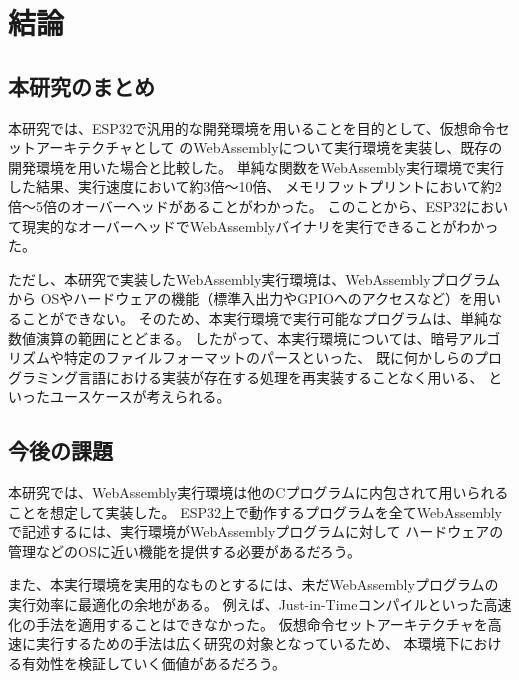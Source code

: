 \chapter{結論}
\label{chap:conclusion}

\section{本研究のまとめ}
\label{section:matome}

本研究では、ESP32で汎用的な開発環境を用いることを目的として、仮想命令セットアーキテクチャとして
のWebAssemblyについて実行環境を実装し、既存の開発環境を用いた場合と比較した。
単純な関数をWebAssembly実行環境で実行した結果、実行速度において約3倍〜10倍、
メモリフットプリントにおいて約2倍〜5倍のオーバーヘッドがあることがわかった。
このことから、ESP32において現実的なオーバーヘッドでWebAssemblyバイナリを実行できることがわかった。

ただし、本研究で実装したWebAssembly実行環境は、WebAssemblyプログラムから
OSやハードウェアの機能（標準入出力やGPIOへのアクセスなど）を用いることができない。
そのため、本実行環境で実行可能なプログラムは、単純な数値演算の範囲にとどまる。
したがって、本実行環境については、暗号アルゴリズムや特定のファイルフォーマットのパースといった、
既に何かしらのプログラミング言語における実装が存在する処理を再実装することなく用いる、
といったユースケースが考えられる。

\section{今後の課題}

本研究では、WebAssembly実行環境は他のCプログラムに内包されて用いられることを想定して実装した。
ESP32上で動作するプログラムを全てWebAssemblyで記述するには、実行環境がWebAssemblyプログラムに対して
ハードウェアの管理などのOSに近い機能を提供する必要があるだろう。

また、本実行環境を実用的なものとするには、未だWebAssemblyプログラムの実行効率に最適化の余地がある。
例えば、Just-in-Timeコンパイルといった高速化の手法を適用することはできなかった。
仮想命令セットアーキテクチャを高速に実行するための手法は広く研究の対象となっているため、
本環境下における有効性を検証していく価値があるだろう。
